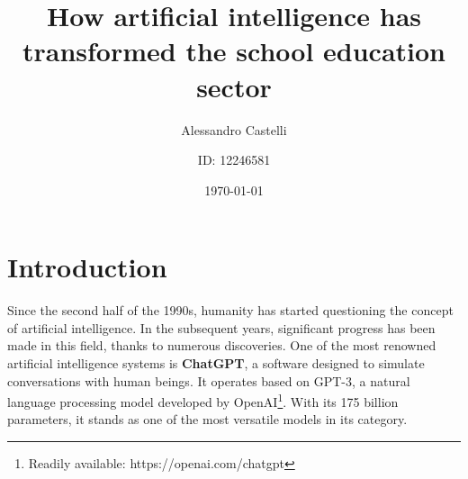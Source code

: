 \documentclass[a4paper,12pt]{article}
\title{How artificial intelligence has transformed the school education sector}
\author{Alessandro Castelli \and ID: 12246581}
\date{\today}
\begin{document}

\maketitle  %
\thispagestyle{empty}   %
\pagebreak  %

\cftsetpnumwidth{0.5cm} %
\renewcommand{\cftsecdotsep}{4} %
\tableofcontents    %


\setcounter{page}{1}    %
\newpage    %

\section{Introduction}  %
Since the second half of the 1990s, humanity has started questioning the concept of artificial intelligence. In the subsequent years, significant progress has been made in this field, thanks to numerous discoveries. One of the most renowned artificial intelligence systems is \textbf{ChatGPT}, a software designed to simulate conversations with human beings. It operates based on GPT-3, a natural language processing model developed by OpenAI\footnote{Readily available: https://openai.com/chatgpt}. With its 175 billion parameters, it stands as one of the most versatile models in its category.
\end{document}
